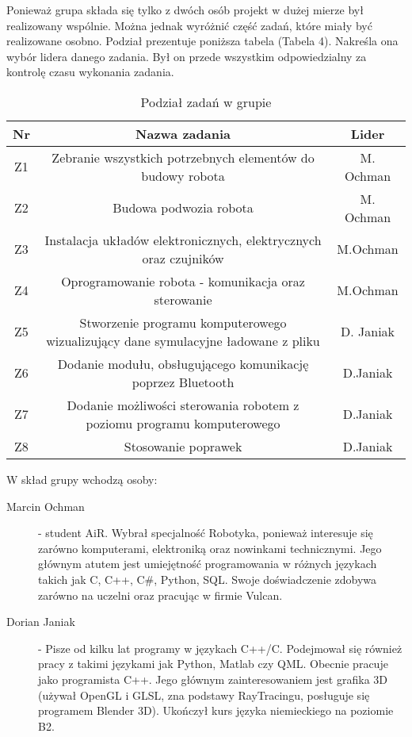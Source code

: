 Ponieważ grupa składa się tylko z dwóch osób projekt w dużej mierze był realizowany wspólnie. Można  jednak wyróżnić część zadań, które miały być realizowane osobno. Podział prezentuje poniższa tabela (Tabela 4). Nakreśla ona wybór lidera danego zadania. Był on przede wszystkim odpowiedzialny za kontrolę czasu wykonania zadania.


\begin{table}[!htbp]
\begin{center}
\begin{tabular}{|c|c|c|}

\hline
\textbf{Nr} & \textbf{Nazwa zadania} & \textbf{Lider} \\ \hline\hline
Z1 & Zebranie wszystkich potrzebnych elementów do budowy robota & M. Ochman \\ \hline
Z2 & Budowa podwozia robota & M. Ochman \\ \hline
Z3 & Instalacja układów elektronicznych, elektrycznych oraz czujników & M.Ochman \\ \hline
Z4 & Oprogramowanie robota - komunikacja oraz sterowanie & M.Ochman \\ \hline
Z5 &Stworzenie programu komputerowego wizualizujący dane symulacyjne ładowane z pliku & D. Janiak \\ \hline
Z6 & Dodanie modułu, obsługującego komunikację poprzez Bluetooth & D.Janiak \\ \hline
Z7 & Dodanie możliwości sterowania robotem z poziomu programu komputerowego & D.Janiak \\ \hline
Z8 & Stosowanie poprawek & D.Janiak \\ \hline


\end{tabular}
\caption{Podział zadań w grupie}
\end{center}
\end{table}

W skład grupy wchodzą osoby:
\begin{description}
\item[Marcin Ochman] - student AiR. Wybrał specjalność Robotyka, ponieważ interesuje się zarówno komputerami, elektroniką oraz nowinkami technicznymi.
	Jego głównym atutem jest umiejętność programowania w różnych językach takich jak C, C++, C\#, Python, SQL. 
	Swoje doświadczenie zdobywa zarówno na uczelni oraz pracując w firmie Vulcan.	
\item[Dorian Janiak] - Pisze od kilku lat programy w językach C++/C. Podejmował się również pracy z takimi językami jak Python, Matlab czy QML. Obecnie pracuje jako programista C++. Jego głównym zainteresowaniem jest grafika 3D (używał OpenGL i GLSL, zna podstawy RayTracingu, posługuje się programem Blender 3D). Ukończył kurs języka niemieckiego na poziomie B2.
\end{description}

